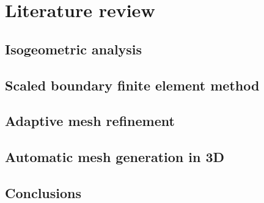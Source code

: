 
\chapter{Literature review}
% 

\section{Isogeometric analysis}
\label{lr_sec:iso_analysis}




\section{Scaled boundary finite element method}
\label{lr_sec:sbfem}


\section{Adaptive mesh refinement}



\section{Automatic mesh generation in 3D}


\section{Conclusions}